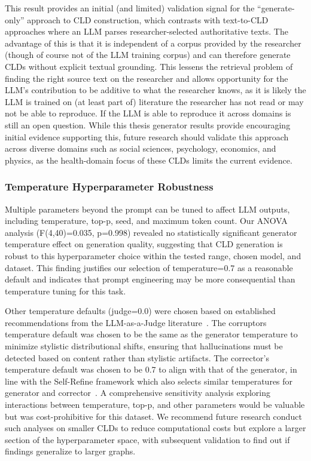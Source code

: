 This result provides an initial (and limited) validation signal for the ``generate-only'' approach to CLD construction, which contrasts with text-to-CLD approaches where an LLM parses researcher-selected authoritative texts. The advantage of this is that it is independent of a corpus provided by the researcher (though of course not of the LLM training corpus) and can therefore generate CLDs without explicit textual grounding. This lessens the retrieval problem of finding the right source text on the researcher and allows opportunity for the LLM's contribution to be additive to what the researcher knows, as it is likely the LLM is trained on (at least part of) literature the researcher has not read or may not be able to reproduce. If the LLM is able to reproduce it across domains is still an open question. While this thesis generator results provide encouraging initial evidence supporting this, future research should validate this approach across diverse domains such as social sciences, psychology, economics, and physics, as the health-domain focus of these CLDs limits the current evidence.

\subsubsection{Temperature Hyperparameter Robustness}

Multiple parameters beyond the prompt can be tuned to affect LLM outputs, including temperature, top-p, seed, and maximum token count. Our ANOVA analysis (F(4,40)=0.035, p=0.998) revealed no statistically significant generator temperature effect on generation quality, suggesting that CLD generation is robust to this hyperparameter choice within the tested range, chosen model, and dataset. This finding justifies our selection of temperature=0.7 as a reasonable default and indicates that prompt engineering may be more consequential than temperature tuning for this task.

Other temperature defaults (judge=0.0) were chosen based on established recommendations from the LLM-as-a-Judge literature~\citep{liu2023gevalnlgevaluationusing, zheng2024judging}.
The corruptors temperature default was chosen to be the same as the generator temperature to minimize stylistic distributional shifts, ensuring that hallucinations must be detected based on content rather than stylistic artifacts.
The corrector's temperature default was chosen to be 0.7 to align with that of the generator, in line with the Self-Refine framework which also selects similar temperatures for generator and corrector~\citep{madaan2023selfrefineiterativerefinementselffeedback}.
A comprehensive sensitivity analysis exploring interactions between temperature, top-p, and other parameters would be valuable but was cost-prohibitive for this dataset. We recommend future research conduct such analyses on smaller CLDs to reduce computational costs but explore a larger section of the hyperparameter space, with subsequent validation to find out if findings generalize to larger graphs.

